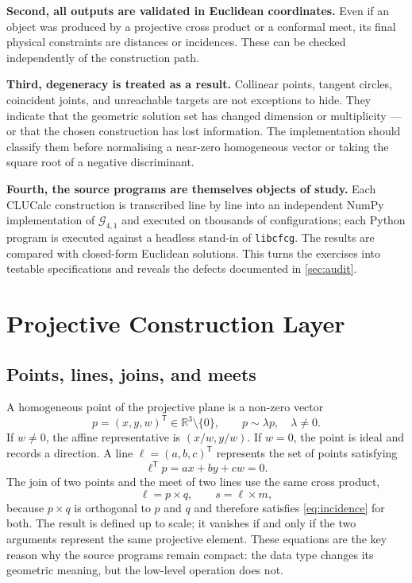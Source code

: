 \documentclass[11pt,a4paper]{article}
\theoremstyle{plain}
\theoremstyle{definition}
\theoremstyle{remark}
\newcommand{\R}{\mathbb{R}}
\newcommand{\GA}{\mathcal{G}_{4,1}}
\newcommand{\T}{\mathsf{T}}
\begin{document}
\textbf{Second, all outputs are validated in Euclidean coordinates.} Even if an
object was produced by a projective cross product or a conformal meet, its
final physical constraints are distances or incidences. These can be checked
independently of the construction path.

\textbf{Third, degeneracy is treated as a result.} Collinear points, tangent
circles, coincident joints, and unreachable targets are not exceptions to hide.
They indicate that the geometric solution set has changed dimension or
multiplicity --- or that the chosen construction has lost information. The
implementation should classify them before normalising a near-zero homogeneous
vector or taking the square root of a negative discriminant.

\textbf{Fourth, the source programs are themselves objects of study.} Each
CLUCalc construction is transcribed line by line into an independent NumPy
implementation of $\GA$ and executed on thousands of configurations; each Python
program is executed against a headless stand-in of \texttt{libcfcg}. The results
are compared with closed-form Euclidean solutions. This turns the exercises into
testable specifications and reveals the defects documented in
\cref{sec:audit}.

\section{Projective Construction Layer}\label{sec:projective}

\subsection{Points, lines, joins, and meets}

A homogeneous point of the projective plane is a non-zero vector
\begin{equation}
  p=(x,y,w)^{\T}\in\R^3\setminus\{0\},
  \qquad p\sim\lambda p,\quad\lambda\neq 0.
  \label{eq:homogeneous-point}
\end{equation}
If $w\neq 0$, the affine representative is $(x/w,y/w)$. If $w=0$, the point is
ideal and records a direction. A line $\ell=(a,b,c)^{\T}$ represents the set
of points satisfying
\begin{equation}
  \ell^{\T}p=ax+by+cw=0.
  \label{eq:incidence}
\end{equation}
The join of two points and the meet of two lines use the same cross product,
\begin{equation}
  \ell=p\times q,
  \qquad
  s=\ell\times m,
  \label{eq:projective-join-meet}
\end{equation}
because $p\times q$ is orthogonal to $p$ and $q$ and therefore satisfies
\cref{eq:incidence} for both. The result is defined up to scale; it vanishes if
and only if the two arguments represent the same projective element. These
equations are the key reason why the source programs remain compact: the data
type changes its geometric meaning, but the low-level operation does not.
\end{document}

